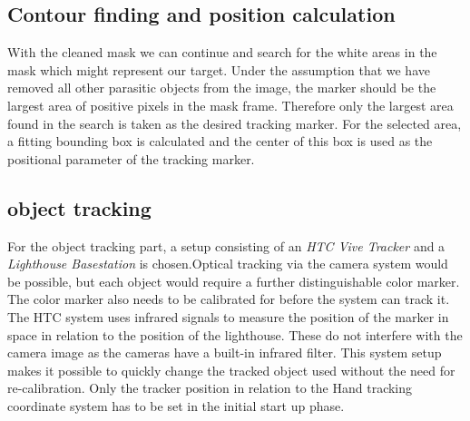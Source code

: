 \subsection{Contour finding and position calculation}
With the cleaned mask we can continue and search for the white areas in the mask which might represent our target. Under the assumption that we have removed all other parasitic objects from the image, the marker should be the largest area of positive pixels in the mask frame. Therefore only the largest area found in the search is taken as the desired tracking marker. For the selected area, a fitting bounding box is calculated and the center of this box is used as the positional parameter of the tracking marker.
\subsection{object tracking}
For the object tracking part, a setup consisting of an \textit{HTC Vive Tracker} and a \textit{Lighthouse Basestation} is chosen.Optical tracking via the camera system would be possible, but each object would require a further distinguishable color marker. The color marker also needs to be calibrated for before the system can track it. The HTC system uses infrared signals to measure the position of the marker in space in relation to the position of the lighthouse. These do not interfere with the camera image as the cameras have a built-in infrared filter. This system setup makes it possible to quickly change the tracked object used without the need for re-calibration. Only the tracker position in relation to the Hand tracking coordinate system has to be set in the initial start up phase.  
